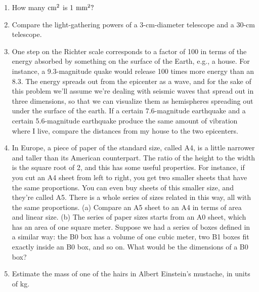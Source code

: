 \begin{enumerate}
\item 
  How many $\textup{cm}^2$ is 1 $\textup{mm}^2?$

\item 
  Compare the light-gathering powers of a 3-cm-diameter
telescope and a 30-cm telescope.

\item   One step on the Richter scale corresponds to a
factor of 100 in terms of the energy absorbed by something
on the surface of the Earth, e.g., a house. For instance, a
9.3-magnitude quake would release 100 times more energy than
an 8.3. The energy spreads out from the epicenter as a wave,
and for the sake of this problem we'll assume we're dealing
with seismic waves that spread out in three dimensions, so
that we can visualize them as hemispheres spreading out
under the surface of the earth. If a certain 7.6-magnitude
earthquake and a certain 5.6-magnitude earthquake produce
the same amount of vibration where I live, compare the
distances from my house to the two epicenters.

\item 
 In Europe, a piece of paper of the standard size,
called A4, is a little narrower and taller than its American
counterpart. The ratio of the height to the width is the
square root of 2, and this has some useful properties. For
instance, if you cut an A4 sheet from left to right, you get
two smaller sheets that have the same proportions. You can
even buy sheets of this smaller size, and they're called A5.
There is a whole series of sizes related in this way, all
with the same proportions. (a) Compare an A5 sheet to an A4
in terms of area and linear size. (b) The series of paper
sizes starts from an A0 sheet, which has an area of one
square meter. Suppose we had a series of boxes defined in a
similar way: the B0 box has a volume of one cubic meter, two
B1 boxes fit exactly inside an B0 box, and so on. What would
be the dimensions of a B0 box? 






\vspace{1.5mm}
\item 
 Estimate the mass of one of the hairs in Albert
Einstein's mustache, in units of kg.





\end{enumerate}
